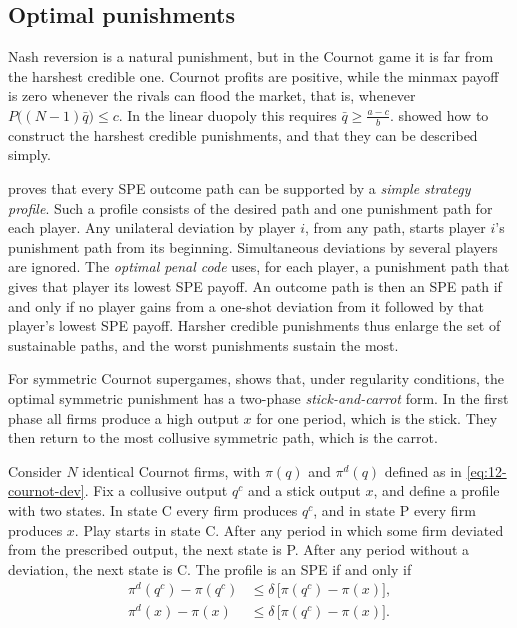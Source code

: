 \subsection{Optimal punishments}\label{sec:12-optimal-punishment}

Nash reversion is a natural punishment, but in the Cournot game it is far from the harshest credible one. Cournot
profits are positive, while the minmax payoff is zero whenever the rivals can flood the market, that is, whenever
$P\bigl((N - 1)\bar q\bigr) \le c$. In the linear duopoly this requires $\bar q \ge \frac{a - c}{b}$. \citet{Abreu1986,Abreu1988} showed how to construct the
harshest credible punishments, and that they can be described simply.

\citet{Abreu1988} proves that every SPE outcome path can be supported by a \emph{simple strategy profile}. Such a
profile consists of the desired path and one punishment path for each player. Any unilateral deviation by player
$i$, from any path, starts player $i$'s punishment path from its beginning. Simultaneous deviations by several
players are ignored. The \emph{optimal penal code} uses, for each player, a punishment path that gives that player its
lowest SPE payoff. An outcome path is then an SPE path if and only if no player gains from a one-shot deviation from
it followed by that player's lowest SPE payoff. Harsher credible punishments thus enlarge the set of sustainable
paths, and the worst punishments sustain the most.

For symmetric Cournot supergames, \citet{Abreu1986} shows that, under regularity conditions, the optimal symmetric
punishment has a two-phase \emph{stick-and-carrot} form. In the first phase all firms produce a high output $x$ for one
period, which is the stick. They then return to the most collusive symmetric path, which is the carrot.

\begin{proposition}\label{prop:12-abreu-two-phase}
Consider $N$ identical Cournot firms, with $\pi(q)$ and $\pi^d(q)$ defined as in \eqref{eq:12-cournot-dev}. Fix a
collusive output $q^c$ and a stick output $x$, and define a profile with two states. In state C every firm produces
$q^c$, and in state P every firm produces $x$. Play starts in state C. After any period in which some firm deviated
from the prescribed output, the next state is P. After any period without a deviation, the next state is C. The
profile is an SPE if and only if
\begin{align}
\pi^d(q^c) - \pi(q^c) &\le \delta\,\bigl[\pi(q^c) - \pi(x)\bigr] , \label{eq:12-carrot}\\
\pi^d(x) - \pi(x) &\le \delta\,\bigl[\pi(q^c) - \pi(x)\bigr] . \label{eq:12-stick}
\end{align}
\end{proposition}

